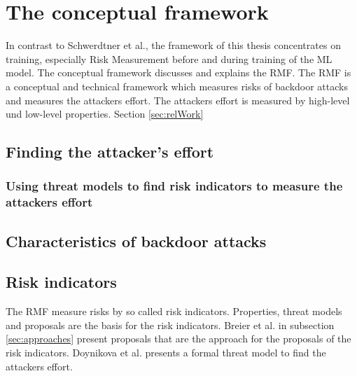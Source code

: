 \section{The conceptual framework}
\label{sec:conFrame}

In contrast to Schwerdtner et al., the framework of this thesis concentrates on training, especially Risk Measurement before and during training of the ML model.
The conceptual framework discusses and explains the RMF. The RMF is a conceptual and technical framework which measures risks of backdoor attacks and measures the attackers effort. The attackers effort is measured by high-level und low-level properties. Section \ref{sec:relWork}

\subsection{Finding the attacker's effort}



\subsubsection*{Using threat models to find risk indicators to measure the attackers effort}

\subsection{Characteristics of backdoor attacks}

\subsection{Risk indicators}
\label{sec:risk_indicators}

The RMF measure risks by so called risk indicators. Properties, threat models and proposals are the basis for the risk indicators. Breier et al. in subsection \ref{sec:approaches} present
proposals that are the approach for the proposals of the risk indicators. Doynikova et al. presents a formal threat model to find the attackers effort. 
